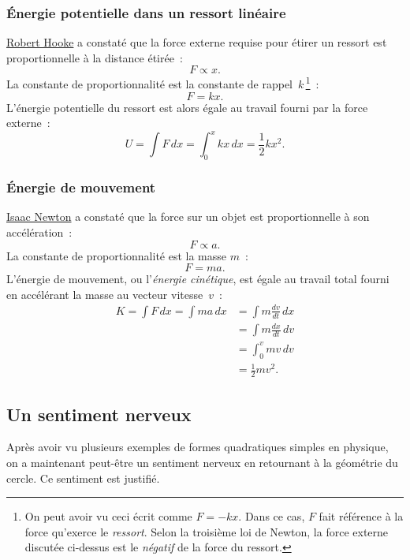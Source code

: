     \subsubsection{Énergie potentielle dans un ressort linéaire} %
    \label{sec:potential_energy_in_a_linear_spring}

\href{https://fr.wikipedia.org/wiki/Robert_Hooke}{Robert Hooke} a constaté que
la force externe requise pour étirer un ressort est proportionnelle à la
distance étirée~:
\[ F \propto x. \]
La constante de proportionnalité est la constante de rappel~$k$\,\footnote{On
peut avoir vu ceci écrit comme $F=-kx$. Dans ce cas, $F$ fait référence à la
force qu'exerce le \emph{ressort}. Selon la troisième loi de Newton, la force
externe discutée ci-dessus est le \emph{négatif} de la force du ressort.}~:
\[ F = k x. \]
L'énergie potentielle du ressort est alors égale au travail fourni par la force
externe~:
\[ U = \int F\,dx = \int_0^x kx\,dx = \textstyle{\frac{1}{2}} kx^2. \]

    \subsubsection{Énergie de mouvement} %
    \label{sec:energy_of_motion}

\href{https://fr.wikipedia.org/wiki/Isaac_Newton}{Isaac Newton} a constaté que
la force sur un objet est proportionnelle à son accélération~:
\[ F \propto a. \]
La constante de proportionnalité est la masse $m$~:
\[ F = m a. \]
L'énergie de mouvement, ou l'\emph{énergie cinétique}, est égale au travail
total fourni en accélérant la masse au vecteur vitesse~$v$~:
\[
\begin{split}
K = \int F\,dx = \int ma\,dx & = \int m\frac{dv}{dt}\,dx \\ & = \int m\frac{dx}{dt}\,dv \\ & = \int_0^v mv\,dv \\ & = \textstyle{\frac{1}{2}} mv^2.
\end{split}
\]

  \subsection{Un sentiment nerveux} %
  \label{sec:a_sense_of_foreboding}

Après avoir vu plusieurs exemples de formes quadratiques simples en physique, on
a maintenant peut-être un sentiment nerveux en retournant à la géométrie du
cercle. Ce sentiment est justifié.

